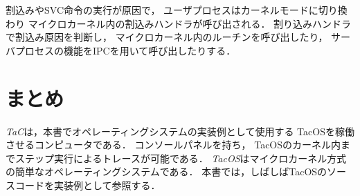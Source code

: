 割込みやSVC命令の実行が原因で，
ユーザプロセスはカーネルモードに切り換わり
マイクロカーネル内の割込みハンドラが呼び出される．
割り込みハンドラで割込み原因を判断し，
マイクロカーネル内のルーチンを呼び出したり，
サーバプロセスの機能をIPCを用いて呼び出したりする．

\section{まとめ}
\emph{TaC}は，本書でオペレーティングシステムの実装例として使用する
TacOSを稼働させるコンピュータである．
コンソールパネルを持ち，
TacOSのカーネル内までステップ実行によるトレースが可能である．
\emph{TacOS}はマイクロカーネル方式の簡単なオペレーティングシステムである．
本書では，しばしばTacOSのソースコードを実装例として参照する．

